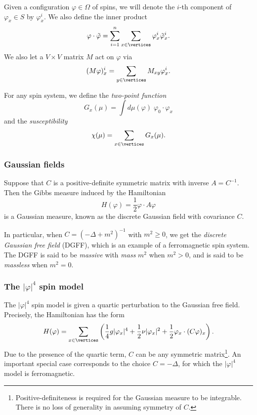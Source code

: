 Given a configuration $\varphi \in \Omega$
of spins, we will denote the $i$-th component of $\varphi_x \in S$ by $\varphi^i_x$.
We also define the inner product
\begin{equation}
\varphi \cdot \tilde\varphi = \sum_{i=1}^n \sum_{x\in\vertices} \varphi^i_x \tilde\varphi^i_x.
\end{equation}
We also let a $V \times V$ matrix $M$ act on $\varphi$ via
\begin{equation}
(M\varphi)^i_x = \sum_{y\in\vertices} M_{xy} \varphi^i_x.
\end{equation}

For any spin system, we define the \emph{two-point function}
\begin{equation}
G_x(\mu) = \int d\mu(\varphi) \; \varphi_0 \cdot \varphi_x
\end{equation}
and the \emph{susceptibility}
\begin{equation}
\chi(\mu) = \sum_{x\in\vertices} G_x(\mu).
\end{equation}


\subsubsection{Gaussian fields}

Suppose that $C$ is a positive-definite symmetric matrix with inverse $A = C^{-1}$.
Then the Gibbs measure induced by the Hamiltonian
\begin{equation}
H(\varphi) = \frac{1}{2} \varphi \cdot A \varphi
\end{equation}
is a Gaussian measure, known as the discrete Gaussian field with covariance $C$.

In particular, when $C = (-\Delta + m^2)^{-1}$ with $m^2 \ge 0$, we get the \emph{discrete Gaussian
free field} (DGFF), which is an example of a ferromagnetic spin system. The DGFF is said to be
\emph{massive} with \emph{mass} $m^2$ when $m^2 > 0$, and is said to be \emph{massless} when $m^2 = 0$.


\subsubsection{The $|\varphi|^4$ spin model}

The $|\varphi|^4$ spin model is given a quartic perturbation to the Gaussian free field.
Precisely, the Hamiltonian has the form
\begin{equation}
H(\varphi)
  =
\sum_{x\in\vertices}
\left(
  \frac{1}{4} g |\varphi_x|^4
    +
  \frac{1}{2} \nu |\varphi_x|^2
    +
  \frac{1}{2} \varphi_x \cdot (C \varphi)_x
\right).
\end{equation}
Due to the presence of the quartic term, $C$ can be any symmetric
matrix\footnote{Positive-definiteness is required for the Gaussian measure to be
integrable. There is no loss of generality in assuming symmetry of $C$.}.
An important special case corresponds to the choice $C = -\Delta$, for which
the $|\varphi|^4$ model is ferromagnetic.


